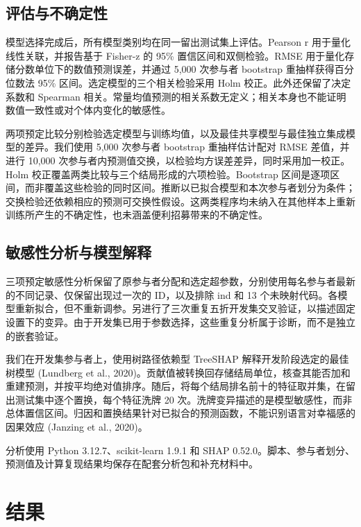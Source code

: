 \documentclass[11pt,letterpaper]{article}
\begin{document}
\subsection{评估与不确定性}\label{ux8bc4ux4f30ux4e0eux4e0dux786eux5b9aux6027}

模型选择完成后，所有模型类别均在同一留出测试集上评估。Pearson r 用于量化线性关联，并报告基于 Fisher-z 的 95\% 置信区间和双侧检验。RMSE 用于量化存储分数单位下的数值预测误差，并通过 5,000 次参与者 bootstrap 重抽样获得百分位数法 95\% 区间。选定模型的三个相关检验采用 Holm 校正。此外还保留了决定系数和 Spearman 相关。常量均值预测的相关系数无定义；相关本身也不能证明数值一致性或对个体内变化的敏感性。

两项预定比较分别检验选定模型与训练均值，以及最佳共享模型与最佳独立集成模型的差异。我们使用 5,000 次参与者 bootstrap 重抽样估计配对 RMSE 差值，并进行 10,000 次参与者内预测值交换，以检验均方误差差异，同时采用加一校正。Holm 校正覆盖两类比较与三个结局形成的六项检验。Bootstrap 区间是逐项区间，而非覆盖这些检验的同时区间。推断以已拟合模型和本次参与者划分为条件；交换检验还依赖相应的预测可交换性假设。这两类程序均未纳入在其他样本上重新训练所产生的不确定性，也未涵盖便利招募带来的不确定性。

\subsection{敏感性分析与模型解释}\label{ux654fux611fux6027ux5206ux6790ux4e0eux6a21ux578bux89e3ux91ca}

三项预定敏感性分析保留了原参与者分配和选定超参数，分别使用每名参与者最新的不同记录、仅保留出现过一次的 ID，以及排除 ind 和 13 个未映射代码。各模型重新拟合，但不重新调参。另进行了三次重复五折开发集交叉验证，以描述固定设置下的变异。由于开发集已用于参数选择，这些重复分析属于诊断，而不是独立的嵌套验证。

我们在开发集参与者上，使用树路径依赖型 TreeSHAP 解释开发阶段选定的最佳树模型 (Lundberg et al., 2020)。贡献值被转换回存储结局单位，核查其能否加和重建预测，并按平均绝对值排序。随后，将每个结局排名前十的特征取并集，在留出测试集中逐个置换，每个特征洗牌 20 次。洗牌变异描述的是模型敏感性，而非总体置信区间。归因和置换结果针对已拟合的预测函数，不能识别语言对幸福感的因果效应 (Janzing et al., 2020)。

分析使用 Python 3.12.7、scikit-learn 1.9.1 和 SHAP 0.52.0。脚本、参与者划分、预测值及计算复现结果均保存在配套分析包和补充材料中。

\FloatBarrier

\section{结果}\label{ux7ed3ux679c}
\end{document}
